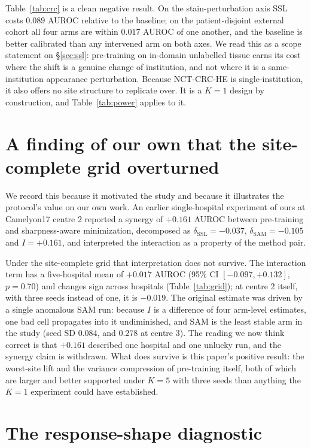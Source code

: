 \documentclass[10pt]{article} %
\begin{document}
Table~\ref{tab:crc} is a clean negative result. On the stain-perturbation axis
SSL costs $0.089$ AUROC relative to the baseline; on the patient-disjoint
external cohort all four arms are within $0.017$ AUROC of one another, and the
baseline is better calibrated than any intervened arm on both axes. We read
this as a scope statement on \S\ref{sec:ssl}: pre-training on in-domain
unlabelled tissue earns its cost where the shift is a genuine change of
institution, and not where it is a same-institution appearance perturbation.
Because NCT-CRC-HE is single-institution, it also offers no site structure to
replicate over. It is a $K=1$ design by construction, and
Table~\ref{tab:power} applies to it.

\section{A finding of our own that the site-complete grid overturned}
\label{app:correction}

We record this because it motivated the study and because it illustrates the
protocol's value on our own work. An earlier single-hospital experiment of ours
at Camelyon17 centre 2 reported a synergy of $+0.161$ AUROC between
pre-training and sharpness-aware minimization, decomposed as
$\delta_{\mathrm{SSL}}=-0.037$, $\delta_{\mathrm{SAM}}=-0.105$ and
$I=+0.161$, and interpreted the interaction as a property of the method pair.

Under the site-complete grid that interpretation does not survive. The
interaction term has a five-hospital mean of $+0.017$ AUROC (95\% CI
$[-0.097,+0.132]$, $p=0.70$) and changes sign across hospitals
(Table~\ref{tab:grid}); at centre 2 itself, with three seeds instead of one, it
is $-0.019$. The original estimate was driven by a single anomalous SAM run:
because $I$ is a difference of four arm-level estimates, one bad cell
propagates into it undiminished, and SAM is the least stable arm in the study
(seed SD $0.084$, and $0.278$ at centre 3). The reading we now think correct is
that $+0.161$ described one hospital and one unlucky run, and the synergy claim
is withdrawn. What does survive is this paper's positive result: the worst-site
lift and the variance compression of pre-training itself, both of which are
larger and better supported under $K=5$ with three seeds than anything the
$K=1$ experiment could have established.

\section{The response-shape diagnostic}
\label{app:shape}
\end{document}
